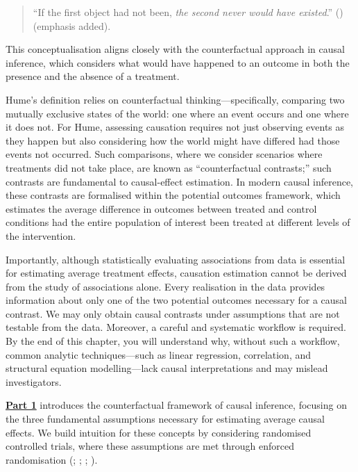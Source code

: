 \documentclass[
  singlecolumn]{article}
\begin{document}
\begin{quote}
``If the first object had not been, \emph{the second never would have
existed}.'' () (emphasis added).
\end{quote}

This conceptualisation aligns closely with the counterfactual approach
in causal inference, which considers what would have happened to an
outcome in both the presence and the absence of a treatment.

Hume's definition relies on counterfactual thinking---specifically,
comparing two mutually exclusive states of the world: one where an event
occurs and one where it does not. For Hume, assessing causation requires
not just observing events as they happen but also considering how the
world might have differed had those events not occurred. Such
comparisons, where we consider scenarios where treatments did not take
place, are known as ``counterfactual contrasts;'' such contrasts are
fundamental to causal-effect estimation. In modern causal inference,
these contrasts are formalised within the potential outcomes framework,
which estimates the average difference in outcomes between treated and
control conditions had the entire population of interest been treated at
different levels of the intervention.

Importantly, although statistically evaluating associations from data is
essential for estimating average treatment effects, causation estimation
cannot be derived from the study of associations alone. Every
realisation in the data provides information about only one of the two
potential outcomes necessary for a causal contrast. We may only obtain
causal contrasts under assumptions that are not testable from the data.
Moreover, a careful and systematic workflow is required. By the end of
this chapter, you will understand why, without such a workflow, common
analytic techniques---such as linear regression, correlation, and
structural equation modelling---lack causal interpretations and may
mislead investigators.

\hyperref[section-part1]{\textbf{Part 1}} introduces the counterfactual
framework of causal inference, focusing on the three fundamental
assumptions necessary for estimating average causal effects. We build
intuition for these concepts by considering randomised controlled
trials, where these assumptions are met through enforced randomisation
(;
;
;
).
\end{document}
